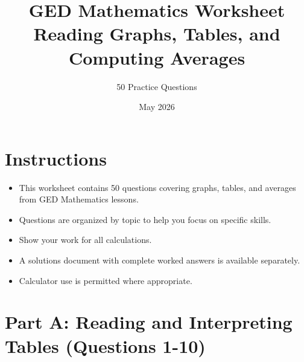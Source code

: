 \documentclass[12pt,a4paper]{article}
\title{\textbf{GED Mathematics Worksheet}\\[0.3cm]\Large{Reading Graphs, Tables, and Computing Averages}}
\author{50 Practice Questions}
\date{May 2026}
\begin{document}
\maketitle

\tableofcontents

\newpage

\section{Instructions}
\begin{itemize}
    \item This worksheet contains 50 questions covering graphs, tables, and averages from GED Mathematics lessons.
    \item Questions are organized by topic to help you focus on specific skills.
    \item Show your work for all calculations.
    \item A solutions document with complete worked answers is available separately.
    \item Calculator use is permitted where appropriate.
\end{itemize}

\newpage

\section{Part A: Reading and Interpreting Tables (Questions 1-10)}
\end{document}

